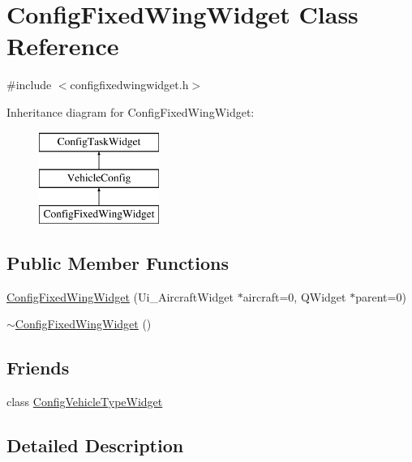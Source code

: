 \hypertarget{class_config_fixed_wing_widget}{\section{\-Config\-Fixed\-Wing\-Widget \-Class \-Reference}
\label{class_config_fixed_wing_widget}
}


{\ttfamily \#include $<$configfixedwingwidget.\-h$>$}

\-Inheritance diagram for \-Config\-Fixed\-Wing\-Widget\-:\begin{figure}[H]
\begin{center}
\leavevmode
\includegraphics[height=3.000000cm]{class_config_fixed_wing_widget}
\end{center}
\end{figure}
\subsection*{\-Public \-Member \-Functions}
\begin{DoxyCompactItemize}
\item 
\hyperlink{group___config_plugin_gaee3501121903de9f9860f69611fd07e6}{\-Config\-Fixed\-Wing\-Widget} (\-Ui\-\_\-\-Aircraft\-Widget $\ast$aircraft=0, \-Q\-Widget $\ast$parent=0)
\item 
\hyperlink{group___config_plugin_ga9f0af233f9470bbaab33d70b96644cef}{$\sim$\-Config\-Fixed\-Wing\-Widget} ()
\end{DoxyCompactItemize}
\subsection*{\-Friends}
\begin{DoxyCompactItemize}
\item 
class \hyperlink{group___config_plugin_gaf1f904d5df6619518f3228b2d5d238d0}{\-Config\-Vehicle\-Type\-Widget}
\end{DoxyCompactItemize}


\subsection{\-Detailed \-Description}


